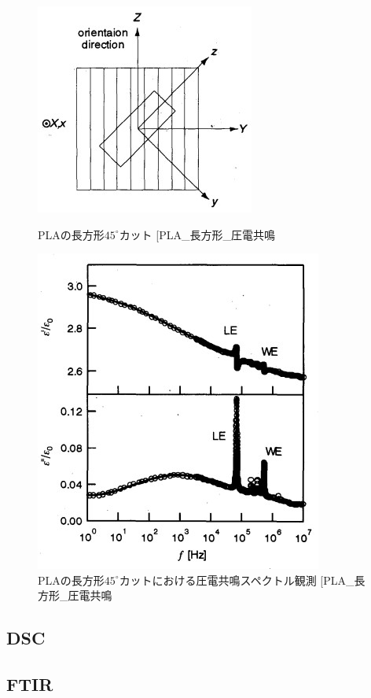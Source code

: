 \documentclass[dvipdfmx,12pt,a4paper]{jreport}
\makeatletter
\DeclareRobustCommand\cite{\unskip
    	\@ifnextchar[{\@tempswatrue\@citex}{\@tempswafalse\@citex[]}}
\makeatother
\begin{document}
			\begin{figure}[h]
				\centering
				\begin{minipage}{0.45\hsize}
					\centering
					\includegraphics{PLA_ずり圧電_長方形カット.jpg}
					\caption{PLAの長方形$45^\circ$カット\cite{PLA_長方形_圧電共鳴}}
					\label{PLA_45_cut}
				\end{minipage}
				\begin{minipage}{0.45\hsize}
					\centering
					\includegraphics{PLA_圧電共鳴スペクトル_長方形.jpg}
					\caption{PLAの長方形$45^{\circ}$カットにおける圧電共鳴スペクトル観測\cite{PLA_長方形_圧電共鳴}}
				\end{minipage}
			\end{figure}
			\newpage
			\subsection{DSC}
			\subsection{FTIR}
\end{document}
